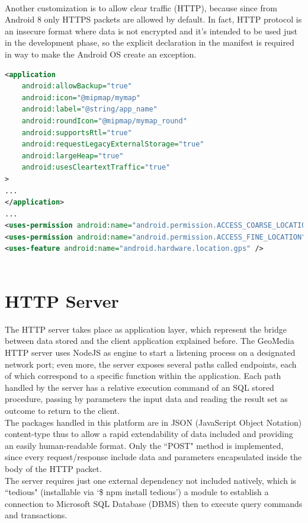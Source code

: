 \documentclass[conference]{IEEEtran}
\begin{document}
\\
Another customization is to allow clear traffic (HTTP), because since from Android 8 only HTTPS packets are allowed by default.
In fact, HTTP protocol is an insecure format where data is not encrypted and it's intended to be used just in the development phase, so the explicit declaration in the manifest is required in way to make the Android OS create an exception.

\begin{lstlisting}[language=XML, caption=Snippet of Android Manifest]
<application
    android:allowBackup="true"
    android:icon="@mipmap/mymap"
    android:label="@string/app_name"
    android:roundIcon="@mipmap/mymap_round"
    android:supportsRtl="true"
    android:requestLegacyExternalStorage="true"
    android:largeHeap="true"
    android:usesCleartextTraffic="true"
>
...
</application>
...
<uses-permission android:name="android.permission.ACCESS_COARSE_LOCATION" />
<uses-permission android:name="android.permission.ACCESS_FINE_LOCATION" />
<uses-feature android:name="android.hardware.location.gps" />
        
\end{lstlisting}

\section{HTTP Server}

The HTTP server takes place as application layer, which represent the bridge between data stored and the client application explained before.
The GeoMedia HTTP server uses NodeJS\cite{b4} as engine to start a listening process on a designated network port; even more, the server exposes several paths called endpoints, each of which correspond to a specific function within the application. 
Each path handled by the server has a relative execution command of an SQL stored procedure, passing by parameters the input data and reading the result set as outcome to return to the client.
\\
The packages handled in this platform are in JSON (JavaScript Object Notation) content-type thus to allow a rapid extendability of data included and providing an easily human-readable format.
Only the ``POST" method is implemented, since every request/response include data and parameters encapsulated inside the body of the HTTP packet.
\\
The server requires just one external dependency not included natively, which is ``tedious"\cite{b5} (installable via `\$ npm install tedious') a module to establish a connection to Microsoft SQL Database (DBMS) then to execute query commands and transactions.
\end{document}
